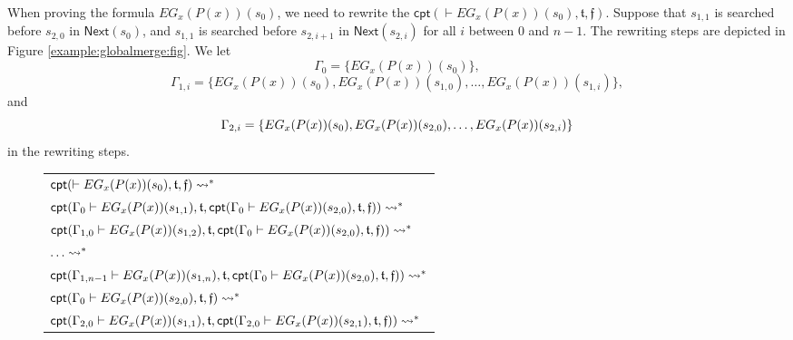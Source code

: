 {\begin{example}
\begin{center}
		\end{center}
		When proving the formula $EG_x(P(x))(s_0)$, we need to rewrite the \CPT{} $\textsf{cpt}(\vdash EG_x(P(x))(s_0), \mathfrak{t},\mathfrak{f})$. Suppose that $s_{1,1}$ is searched before $s_{2,0}$ in $\textsf{Next}(s_0)$, and $s_{1,1}$ is searched before $s_{2,i+1}$ in $\textsf{Next}(s_{2,i})$ for all $i$ between $0$ and $n-1$. The rewriting steps are depicted in Figure \ref{example:globalmerge:fig}. We let {$$\Gamma_0=\{EG_{x}(P(x))(s_0)\},$$} {$$ \Gamma_{1,i}=\{EG_x(P(x))(s_0), EG_x(P(x))(s_{1,0}),\ldots,EG_x(P(x))(s_{1,i})\},$$} and {$$\Gamma_{2,i}=\{EG_x(P(x))(s_0), EG_x(P(x))(s_{2,0}),\ldots,\\EG_x(P(x))(s_{2,i})\}$$} in the rewriting steps.
		\begin{figure}[h!]\small
			\centering
			\color{blue}
			\begin{tabular}{|l|}
				\hline
				$
				\textsf{cpt}(\vdash EG_x(P(x))(s_0),\mathfrak{t},\mathfrak{f}) \rightsquigarrow^*$\\
				$\textsf{cpt}(\Gamma_{0}\vdash EG_x(P(x))(s_{1,1}),\mathfrak{t},\textsf{cpt}(\Gamma_{0}\vdash EG_x(P(x))(s_{2,0}), \mathfrak{t},\mathfrak{f}))\rightsquigarrow^*
				$\\
				$\textsf{cpt}(\Gamma_{1,0}\vdash EG_x(P(x))(s_{1,2}),\mathfrak{t},\textsf{cpt}(\Gamma_{0}\vdash EG_x(P(x))(s_{2,0}), \mathfrak{t},\mathfrak{f}))\rightsquigarrow^*
				$\\
				$\ldots\rightsquigarrow^*$\\
				$\textsf{cpt}(\Gamma_{1,n-1}\vdash EG_x(P(x))(s_{1,n}),\mathfrak{t},\textsf{cpt}(\Gamma_{0}\vdash EG_x(P(x))(s_{2,0}), \mathfrak{t},\mathfrak{f}))\rightsquigarrow^*$\\
				$\textsf{cpt}(\Gamma_{0}\vdash EG_x(P(x))(s_{2,0}), \mathfrak{t},\mathfrak{f})\rightsquigarrow^*$\\
				$\textsf{cpt}(\Gamma_{2,0}\vdash EG_x(P(x))(s_{1,1}), \mathfrak{t},\textsf{cpt}(\Gamma_{2,0}\vdash EG_x(P(x))(s_{2,1}), \mathfrak{t},\mathfrak{f}))\rightsquigarrow^*$\\

\end{tabular}
\end{figure}
\end{example}}
